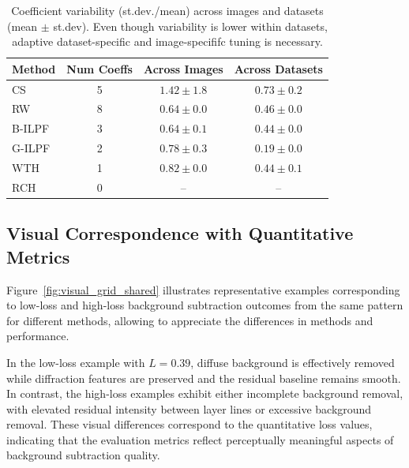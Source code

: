 \documentclass[iucr]{iucrjournals}
\begin{document}
\begin{table}[t]
\centering
\small
\caption{Coefficient variability (st.dev./mean) across images and datasets (mean $\pm$ st.dev). Even though variability is lower within datasets, adaptive dataset-specific and image-specififc tuning is necessary.}
\label{tab:summary_total_variability}
\begin{tabular}{@{}lccc@{}}
\toprule
\textbf{Method} & \textbf{Num Coeffs} & \textbf{Across Images} & \textbf{Across Datasets} \\
\midrule
CS & 5 & $1.42 \pm 1.8$ & $0.73 \pm 0.2$ \\
RW & 8 & $0.64 \pm 0.0$ & $0.46 \pm 0.0$ \\
B-ILPF & 3 & $0.64 \pm 0.1$ & $0.44 \pm 0.0$ \\
G-ILPF & 2 & $0.78 \pm 0.3$ & $0.19 \pm 0.0$ \\
WTH & 1 & $0.82 \pm 0.0$ & $0.44 \pm 0.1$ \\
RCH & 0 & -- & -- \\
\bottomrule
\end{tabular}
\end{table}


\subsection{Visual Correspondence with Quantitative Metrics}

Figure~\ref{fig:visual_grid_shared} illustrates representative examples corresponding to low-loss and high-loss background subtraction outcomes from the same pattern for different methods, allowing to appreciate the differences in methods and performance.

In the low-loss example with $L=0.39$, diffuse background is effectively removed while diffraction features are preserved and the residual baseline remains smooth. In contrast, the high-loss examples exhibit either incomplete background removal, with elevated residual intensity between layer lines or excessive background removal. These visual differences correspond to the quantitative loss values, indicating that the evaluation metrics reflect perceptually meaningful aspects of background subtraction quality.


\end{document}
